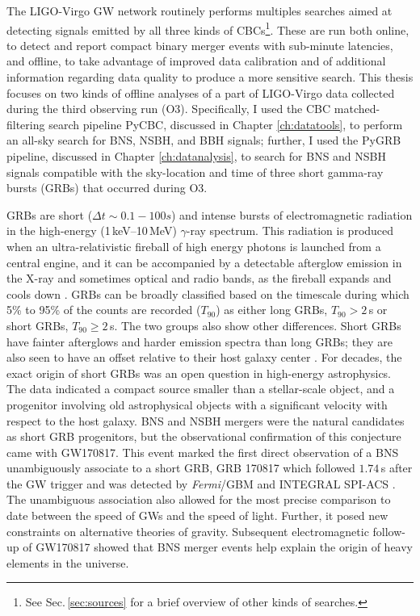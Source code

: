 \documentclass[binding=0.6cm, LaM]{sapthesis}
\begin{document}
	The LIGO-Virgo GW network routinely performs multiples searches aimed at detecting signals 
	emitted by all three kinds of CBCs\footnote{See Sec.\,\ref{sec:sources} for a brief overview of other kinds of searches.}.
        These are run both online, to detect and report compact binary merger events 
	with sub-minute latencies, and offline, to take advantage of improved data calibration 	
	and of additional information regarding data quality to produce a more sensitive search.
	This thesis focuses on two kinds of offline analyses of a part of LIGO-Virgo data collected during the third observing run (O3).
        Specifically, I used the CBC matched-filtering search pipeline {\ttfamily PyCBC}, discussed in Chapter \ref{ch:datatools}, 
	to perform an all-sky search for BNS, NSBH, and BBH signals; further, I used the {\ttfamily PyGRB} pipeline, 
	discussed in Chapter \ref{ch:datanalysis}, to search for BNS and NSBH signals compatible 
	with the sky-location and time of three short gamma-ray bursts (GRBs) that occurred during O3.

	GRBs are short ($\Delta t \sim 0.1-100s$) and intense bursts of 
	electromagnetic radiation in the high-energy (1\,keV--10\,MeV) $\gamma$-ray spectrum.
	This radiation is produced when an ultra-relativistic fireball of high energy photons 
	is launched from a central engine, and it can be accompanied by a detectable afterglow emission 
	in the X-ray and sometimes optical and radio bands, as the fireball expands and cools down \cite{139}.
	GRBs can be broadly classified based on the timescale during which 5\% to 95\% of the counts are recorded ($T_{90}$)
	as either long GRBs, $T_{90} > 2\,$s or short GRBs, $T_{90} \geq 2\,$s.
	The two groups also show other differences.  
	Short GRBs have fainter afterglows and harder emission spectra than long GRBs; 
	they are also seen to have an offset relative to their host galaxy center \cite{162}.
	For decades, the exact origin of short GRBs was an open question in high-energy astrophysics.  
	The data indicated a compact source smaller than a stellar-scale object, 
	and a progenitor involving old astrophysical objects with a significant velocity with respect to the host galaxy.  
	BNS and NSBH mergers were the natural candidates as short GRB progenitors, 
	but the observational confirmation of this conjecture came with GW170817.
	This event marked the first direct observation of a BNS unambiguously associate to a short GRB, 
	GRB 170817 which followed $1.74\,$s after the GW trigger and was detected by {\it Fermi}/GBM and INTEGRAL SPI-ACS \cite{15}.
	The unambiguous association also allowed for the most precise comparison to date
	between the speed of GWs and the speed of light.  
	Further, it posed new constraints on alternative theories of gravity. 
	Subsequent electromagnetic follow-up of GW170817 showed that BNS merger events 
	help explain the origin of heavy elements in the universe.
\end{document}
